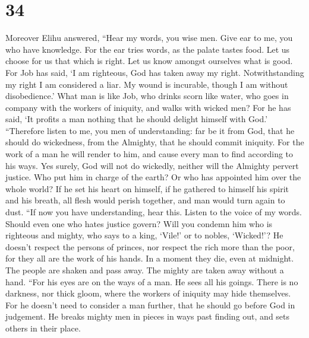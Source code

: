 \hypertarget{section-33}{%
\section{34}\label{section-33}}

 Moreover Elihu answered,  ``Hear my words,
you wise men. Give ear to me, you who have knowledge.  For
the ear tries words, as the palate tastes food.  Let us
choose for us that which is right. Let us know amongst ourselves what is
good.  For Job has said, `I am righteous, God has taken
away my right.  Notwithstanding my right I am considered a
liar. My wound is incurable, though I am without disobedience.'
 What man is like Job, who drinks scorn like water,
 who goes in company with the workers of iniquity, and
walks with wicked men?  For he has said, `It profits a man
nothing that he should delight himself with God.' 
``Therefore listen to me, you men of understanding: far be it from God,
that he should do wickedness, from the Almighty, that he should commit
iniquity.  For the work of a man he will render to him,
and cause every man to find according to his ways.  Yes
surely, God will not do wickedly, neither will the Almighty pervert
justice.  Who put him in charge of the earth? Or who has
appointed him over the whole world?  If he set his heart
on himself, if he gathered to himself his spirit and his breath,
 all flesh would perish together, and man would turn
again to dust.  ``If now you have understanding, hear
this. Listen to the voice of my words.  Should even one
who hates justice govern? Will you condemn him who is righteous and
mighty,  who says to a king, `Vile!' or to nobles,
`Wicked!'?  He doesn't respect the persons of princes,
nor respect the rich more than the poor, for they all are the work of
his hands.  In a moment they die, even at midnight. The
people are shaken and pass away. The mighty are taken away without a
hand.  ``For his eyes are on the ways of a man. He sees
all his goings.  There is no darkness, nor thick gloom,
where the workers of iniquity may hide themselves.  For
he doesn't need to consider a man further, that he should go before God
in judgement.  He breaks mighty men in pieces in ways
past finding out, and sets others in their place. 
